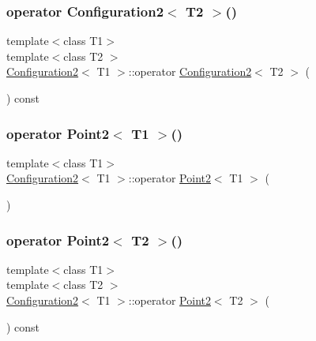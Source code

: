 \subsubsection{\texorpdfstring{operator Configuration2$<$ T2 $>$()}{operator Configuration2< T2 >()}}
{\footnotesize\ttfamily template$<$class T1$>$ \\
template$<$class T2 $>$ \\
\mbox{\hyperlink{class_configuration2}{Configuration2}}$<$ T1 $>$\+::operator \mbox{\hyperlink{class_configuration2}{Configuration2}}$<$ T2 $>$ (\begin{DoxyParamCaption}{ }\end{DoxyParamCaption}) const\hspace{0.3cm}{\ttfamily [inline]}}

\mbox{\label{class_configuration2_a8f9c571c4438c591dbafbd76eda85a0e}} 
\subsubsection{\texorpdfstring{operator Point2$<$ T1 $>$()}{operator Point2< T1 >()}}
{\footnotesize\ttfamily template$<$class T1$>$ \\
\mbox{\hyperlink{class_configuration2}{Configuration2}}$<$ T1 $>$\+::operator \mbox{\hyperlink{class_point2}{Point2}}$<$ T1 $>$ (\begin{DoxyParamCaption}{ }\end{DoxyParamCaption})\hspace{0.3cm}{\ttfamily [inline]}}

\mbox{\label{class_configuration2_a68bfa8b94c1cff3179698e00edb2890e}} 
\subsubsection{\texorpdfstring{operator Point2$<$ T2 $>$()}{operator Point2< T2 >()}}
{\footnotesize\ttfamily template$<$class T1$>$ \\
template$<$class T2 $>$ \\
\mbox{\hyperlink{class_configuration2}{Configuration2}}$<$ T1 $>$\+::operator \mbox{\hyperlink{class_point2}{Point2}}$<$ T2 $>$ (\begin{DoxyParamCaption}{ }\end{DoxyParamCaption}) const\hspace{0.3cm}{\ttfamily [inline]}}




